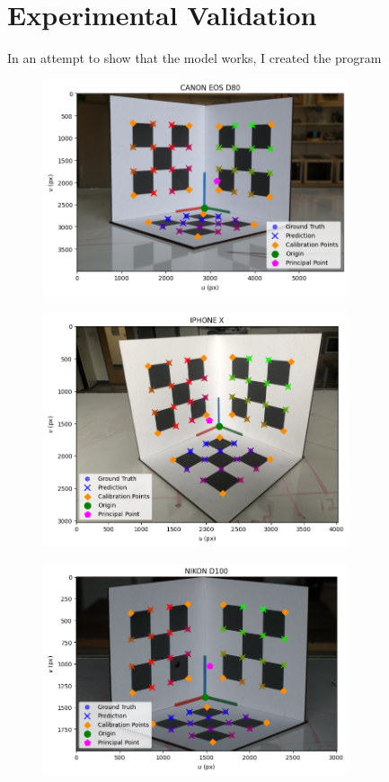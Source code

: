 \section{Experimental Validation}

In an attempt to show that the model works, I created the program


\begin{figure}[H]
    \centering
    \includegraphics[width=0.8\textwidth]{assets/results/CANON EOS D80/graph.png}
\end{figure}

\begin{figure}[H]
    \centering
    \includegraphics[width=0.8\textwidth]{assets/results/IPHONE X/graph.png}
\end{figure}

\begin{figure}[H]
    \centering
    \includegraphics[width=0.8\textwidth]{assets/results/NIKON D100/graph.png}
\end{figure}

